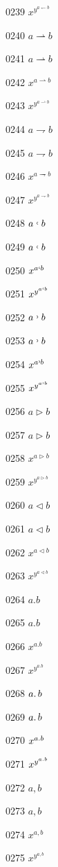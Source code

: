 \documentclass{article}
\begin{document}
0239 $x^{y^{a\leftharpoondown b}}$\par
0240 $a\rightharpoonup b$\par
0241 $\displaystyle a\rightharpoonup b$\par
0242 $x^{a\rightharpoonup b}$\par
0243 $x^{y^{a\rightharpoonup b}}$\par
0244 $a\rightharpoondown b$\par
0245 $\displaystyle a\rightharpoondown b$\par
0246 $x^{a\rightharpoondown b}$\par
0247 $x^{y^{a\rightharpoondown b}}$\par
0248 $a\lhook b$\par
0249 $\displaystyle a\lhook b$\par
0250 $x^{a\lhook b}$\par
0251 $x^{y^{a\lhook b}}$\par
0252 $a\rhook b$\par
0253 $\displaystyle a\rhook b$\par
0254 $x^{a\rhook b}$\par
0255 $x^{y^{a\rhook b}}$\par
0256 $a\triangleright b$\par
0257 $\displaystyle a\triangleright b$\par
0258 $x^{a\triangleright b}$\par
0259 $x^{y^{a\triangleright b}}$\par
0260 $a\triangleleft b$\par
0261 $\displaystyle a\triangleleft b$\par
0262 $x^{a\triangleleft b}$\par
0263 $x^{y^{a\triangleleft b}}$\par
0264 $a.b$\par
0265 $\displaystyle a.b$\par
0266 $x^{a.b}$\par
0267 $x^{y^{a.b}}$\par
0268 $a\ldotp b$\par
0269 $\displaystyle a\ldotp b$\par
0270 $x^{a\ldotp b}$\par
0271 $x^{y^{a\ldotp b}}$\par
0272 $a,b$\par
0273 $\displaystyle a,b$\par
0274 $x^{a,b}$\par
0275 $x^{y^{a,b}}$\par
\end{document}
